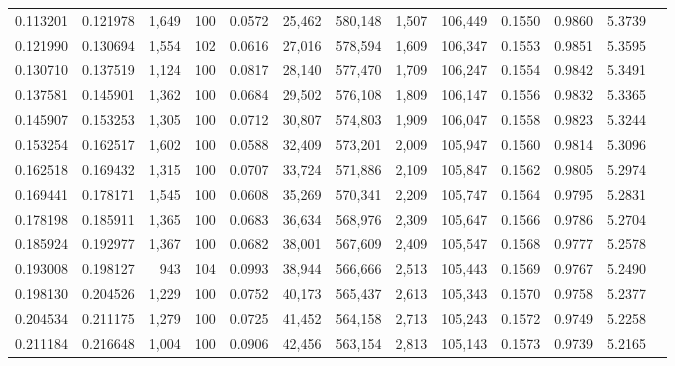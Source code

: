 \begin{tabular}{rrrrrrrrrrrrr}
0.113201 & 0.121978 & 1,649 & 100 &                                     0.0572 &  25,462 & 580,148 &   1,507 & 106,449 & 0.1550 & 0.9860 & 5.3739 \\
0.121990 & 0.130694 & 1,554 & 102 &                                     0.0616 &  27,016 & 578,594 &   1,609 & 106,347 & 0.1553 & 0.9851 & 5.3595 \\
0.130710 & 0.137519 & 1,124 & 100 &                                     0.0817 &  28,140 & 577,470 &   1,709 & 106,247 & 0.1554 & 0.9842 & 5.3491 \\
0.137581 & 0.145901 & 1,362 & 100 &                                     0.0684 &  29,502 & 576,108 &   1,809 & 106,147 & 0.1556 & 0.9832 & 5.3365 \\
0.145907 & 0.153253 & 1,305 & 100 &                                     0.0712 &  30,807 & 574,803 &   1,909 & 106,047 & 0.1558 & 0.9823 & 5.3244 \\
0.153254 & 0.162517 & 1,602 & 100 &                                     0.0588 &  32,409 & 573,201 &   2,009 & 105,947 & 0.1560 & 0.9814 & 5.3096 \\
0.162518 & 0.169432 & 1,315 & 100 &                                     0.0707 &  33,724 & 571,886 &   2,109 & 105,847 & 0.1562 & 0.9805 & 5.2974 \\
0.169441 & 0.178171 & 1,545 & 100 &                                     0.0608 &  35,269 & 570,341 &   2,209 & 105,747 & 0.1564 & 0.9795 & 5.2831 \\
0.178198 & 0.185911 & 1,365 & 100 &                                     0.0683 &  36,634 & 568,976 &   2,309 & 105,647 & 0.1566 & 0.9786 & 5.2704 \\
0.185924 & 0.192977 & 1,367 & 100 &                                     0.0682 &  38,001 & 567,609 &   2,409 & 105,547 & 0.1568 & 0.9777 & 5.2578 \\
0.193008 & 0.198127 &   943 & 104 &                                     0.0993 &  38,944 & 566,666 &   2,513 & 105,443 & 0.1569 & 0.9767 & 5.2490 \\
0.198130 & 0.204526 & 1,229 & 100 &                                     0.0752 &  40,173 & 565,437 &   2,613 & 105,343 & 0.1570 & 0.9758 & 5.2377 \\
0.204534 & 0.211175 & 1,279 & 100 &                                     0.0725 &  41,452 & 564,158 &   2,713 & 105,243 & 0.1572 & 0.9749 & 5.2258 \\
0.211184 & 0.216648 & 1,004 & 100 &                                     0.0906 &  42,456 & 563,154 &   2,813 & 105,143 & 0.1573 & 0.9739 & 5.2165 \\

\end{tabular}
